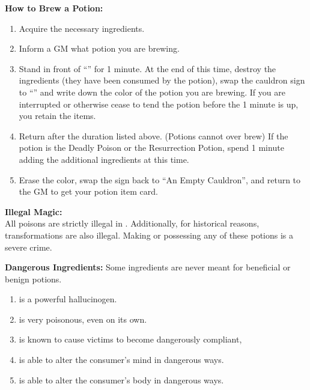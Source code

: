 \documentclass[green]{NeptuneBall}
\begin{document}
{\bf How to Brew a Potion:}
\begin{enumerate}
  \item Acquire the necessary ingredients.
	\item Inform a GM what potion you are brewing.
  \item Stand in front of ``\sEmptyCauldron{}'' for 1 minute. At the end of this time, destroy the ingredients (they have been consumed by the potion), swap the cauldron sign to ``\sFullCauldron{}'' and write down the color of the potion you are brewing. If you are interrupted or otherwise cease to tend the potion before the 1 minute is up, you retain the items.
  \item Return after the duration listed above. (Potions cannot over brew) If the potion is the Deadly Poison or the Resurrection Potion, spend 1 minute adding the additional ingredients at this time.
  \item Erase the color, swap the sign back to ``An Empty Cauldron'', and return to the GM to get your potion item card.
\end{enumerate}

{\bf Illegal Magic:}\\
All poisons are strictly illegal in \pAtlantis{}. Additionally, for historical reasons, transformations are also illegal. Making or possessing any of these potions is a severe crime.

{\bf Dangerous Ingredients:}
Some ingredients are never meant for beneficial or benign potions. 
\begin{enumerate}
\item \iHemlock{} is a powerful hallucinogen.  %
\item \iSnails{} is very poisonous, even on its own. %
\item \iPearl{} is  known to cause victims to become dangerously compliant, %
\item \iManOfWar{} is able to alter the consumer's mind in dangerous ways. %
\item \iSquid{} is able to alter the consumer's body in dangerous ways.  %
\end{enumerate}
\end{document}
